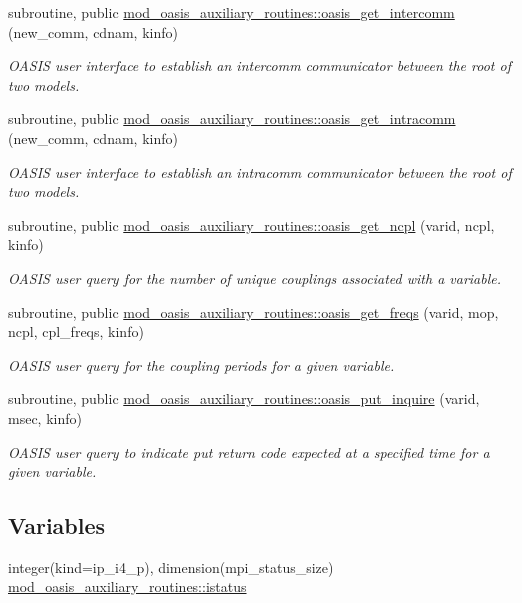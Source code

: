 \begin{DoxyCompactItemize}
subroutine, public \hyperlink{namespacemod__oasis__auxiliary__routines_a589021c0f1427f8e5edb1c7efcd7fa2c}{mod\+\_\+oasis\+\_\+auxiliary\+\_\+routines\+::oasis\+\_\+get\+\_\+intercomm} (new\+\_\+comm, cdnam, kinfo)
\begin{DoxyCompactList}\small\item\em O\+A\+S\+IS user interface to establish an intercomm communicator between the root of two models. \end{DoxyCompactList}\item 
subroutine, public \hyperlink{namespacemod__oasis__auxiliary__routines_aa1959db40e8c27dea289b97458929526}{mod\+\_\+oasis\+\_\+auxiliary\+\_\+routines\+::oasis\+\_\+get\+\_\+intracomm} (new\+\_\+comm, cdnam, kinfo)
\begin{DoxyCompactList}\small\item\em O\+A\+S\+IS user interface to establish an intracomm communicator between the root of two models. \end{DoxyCompactList}\item 
subroutine, public \hyperlink{namespacemod__oasis__auxiliary__routines_a154d3345ef9691e378afdc871086f7eb}{mod\+\_\+oasis\+\_\+auxiliary\+\_\+routines\+::oasis\+\_\+get\+\_\+ncpl} (varid, ncpl, kinfo)
\begin{DoxyCompactList}\small\item\em O\+A\+S\+IS user query for the number of unique couplings associated with a variable. \end{DoxyCompactList}\item 
subroutine, public \hyperlink{namespacemod__oasis__auxiliary__routines_a62d1c98c05bcc4bd5e8796866bcce2db}{mod\+\_\+oasis\+\_\+auxiliary\+\_\+routines\+::oasis\+\_\+get\+\_\+freqs} (varid, mop, ncpl, cpl\+\_\+freqs, kinfo)
\begin{DoxyCompactList}\small\item\em O\+A\+S\+IS user query for the coupling periods for a given variable. \end{DoxyCompactList}\item 
subroutine, public \hyperlink{namespacemod__oasis__auxiliary__routines_a7a95eb579171b6c2f06ff532c7823e2e}{mod\+\_\+oasis\+\_\+auxiliary\+\_\+routines\+::oasis\+\_\+put\+\_\+inquire} (varid, msec, kinfo)
\begin{DoxyCompactList}\small\item\em O\+A\+S\+IS user query to indicate put return code expected at a specified time for a given variable. \end{DoxyCompactList}\end{DoxyCompactItemize}
\subsection*{Variables}
\begin{DoxyCompactItemize}
\item 
integer(kind=ip\+\_\+i4\+\_\+p), dimension(mpi\+\_\+status\+\_\+size) \hyperlink{namespacemod__oasis__auxiliary__routines_a284fcb0384dbbf081a6930256fc12b27}{mod\+\_\+oasis\+\_\+auxiliary\+\_\+routines\+::istatus}
\end{DoxyCompactItemize}
